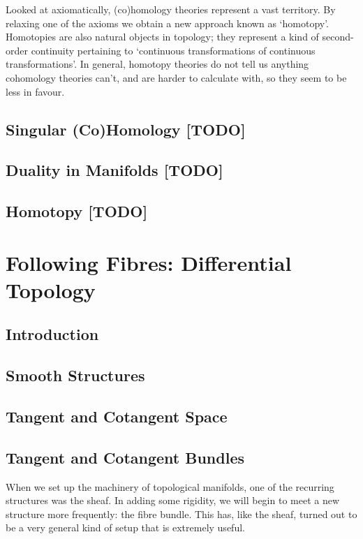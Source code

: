 \documentclass[oneside,english]{amsbook}
\numberwithin{section}{chapter}
\theoremstyle{plain}
\theoremstyle{definition}
\begin{document}
Looked at axiomatically, (co)homology theories represent a vast territory. By relaxing one of the axioms we obtain a new approach known as `homotopy'. Homotopies are also natural objects in topology; they represent a kind of second-order continuity pertaining to `continuous transformations of continuous transformations'. In general, homotopy theories do not tell us anything cohomology theories can't, and are harder to calculate with, so they seem to be less in favour.

\section{Singular (Co)Homology [TODO]}

\section{Duality in Manifolds [TODO]}

\section{Homotopy [TODO]}







\chapter{Following Fibres: Differential Topology}


\section{Introduction}

\section{Smooth Structures}

\section{Tangent and Cotangent Space}

\section{Tangent and Cotangent Bundles}

When we set up the machinery of topological manifolds, one of the recurring structures was the sheaf. In adding some rigidity, we will begin to meet a new structure more frequently: the fibre bundle. This has, like the sheaf, turned out to be a very general kind of setup that is extremely useful.
\end{document}
